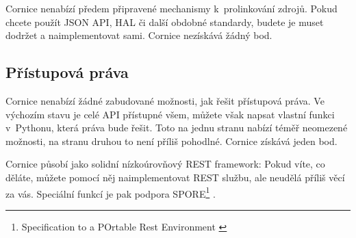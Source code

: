 Cornice nenabízí předem připravené mechanismy k~prolinkování zdrojů. Pokud chcete použít JSON API, HAL či další obdobné standardy, budete je muset dodržet a naimplementovat sami. Cornice nezískává žádný bod.

\subsection{Přístupová práva}\label{pux159uxedstupovuxe1-pruxe1va}

Cornice nenabízí žádné zabudované možnosti, jak řešit přístupová práva. Ve výchozím stavu je celé API přístupné všem, můžete však napsat vlastní funkci v~Pythonu, která práva bude řešit. Toto na jednu stranu nabízí téměř neomezené možnosti, na stranu druhou to není příliš pohodlné. Cornice získává jeden bod.

Cornice působí jako solidní nízkoúrovňový REST framework: Pokud víte, co děláte, můžete pomocí něj naimplementovat REST službu, ale neudělá příliš věcí za vás. Speciální funkcí je pak podpora SPORE\footnote{Specification to a POrtable Rest Environment \autocite{spore}} \autocite{cornicespore}.

